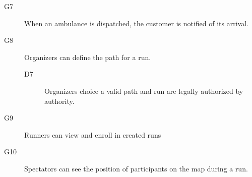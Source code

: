 \documentclass[../main.tex]{subfiles}
\begin{document}
\begin{description}
	\item [G7]  When an ambulance is dispatched, the customer is notified of its arrival.
	\begin{description}
		\item
	\end{description}

	\item [G8]  Organizers can define the path for a run.
	\begin{description}
		\item [D7] Organizers choice a valid path and run are legally authorized by authority.
	\end{description}

	\item [G9]  Runners can view and enroll in created runs
	\begin{description}
		\item []
	\end{description}

	\item [G10] Spectators can see the position of participants on the map during a run.
	\begin{description}
		\item
	\end{description}
\end{description}
\end{document}
